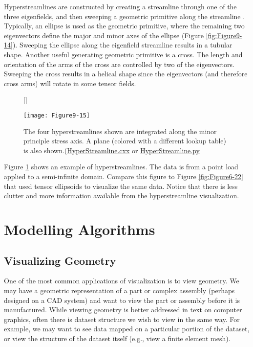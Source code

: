 Hyperstreamlines are constructed by creating a streamline through one of the three eigenfields, and then sweeping a geometric primitive along the streamline \cite{Delmarcelle93}. Typically, an ellipse is used as the geometric primitive, where the remaining two eigenvectors define the major and minor axes of the ellipse (Figure \ref{fig:Figure9-14}). Sweeping the ellipse along the eigenfield streamline results in a tubular shape. Another useful generating geometric primitive is a cross. The length and orientation of the arms of the cross are controlled by two of the eigenvectors. Sweeping the cross results in a helical shape since the eigenvectors (and therefore cross arms) will rotate in some tensor fields.

\begin{figure}[!htb]
	[\FBwidth]
	{\caption{The four hyperstreamlines shown are integrated along the minor principle stress axis. A plane (colored with a different lookup table) is also shown.(\href{https://lorensen.github.io/VTKExamples/site/Cxx/VisualizationAlgorithms/HyperStreamline/}{HyperStreamline.cxx} or \href{https://lorensen.github.io/VTKExamples/site/Python/VisualizationAlgorithms/HyperStreamline/}{HyperStreamline.py}}\label{fig:Figure9-15}}
	{\texttt{[image: Figure9-15]}}
\end{figure}


Figure \ref{fig:Figure9-15} shows an example of hyperstreamlines. The data is from a point load applied to a semi-infinite domain. Compare this figure to Figure \ref{fig:Figure6-22} that used tensor ellipsoids to visualize the same data. Notice that there is less clutter and more information available from the hyperstreamline visualization.

\section{Modelling Algorithms}

\subsection{Visualizing Geometry}

One of the most common applications of visualization is to view geometry. We may have a geometric representation of a part or complex assembly (perhaps designed on a CAD system) and want to view the part or assembly before it is manufactured. While viewing geometry is better addressed in text on computer graphics, often there is dataset structure we wish to view in the same way. For example, we may want to see data mapped on a particular portion of the dataset, or view the structure of the dataset itself (e.g., view a finite element mesh).


